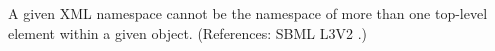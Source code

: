 A given XML namespace cannot be the namespace of more than one top-level
element within a given \Annotation object.  (References: SBML L3V2
.)

